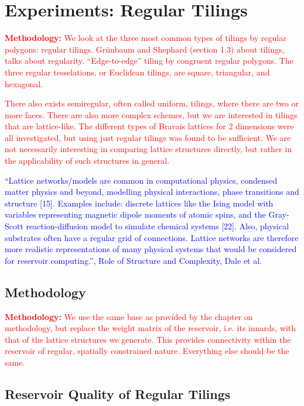 \chapter{Experiments: Regular Tilings}

\textcolor{red}{
  \textbf{Methodology:} We look at the three most common types of tilings by
regular polygons: regular tilings. Grünbaum and Shephard (section 1.3) about
tilings, talks about regularity. ``Edge-to-edge'' tiling by congruent regular
polygons. The three regular tesselations, or Euclidean tilings, are square,
triangular, and hexagonal.
}

\textcolor{red}{
  There also exists semiregular, often called uniform, tilings, where there are
two or more faces. There are also more complex schemes, but we are interested in
tilings that are lattice-like. The different types of Bravais lattices for 2
dimensions were all investigated, but using just regular tilings was found to be
sufficient. We are not necessarily interesting in comparing lattice structures
directly, but rather in the applicability of such structures in general.
}

\textcolor{blue}{
  ``Lattice networks/models are common in computational physics, condensed
matter physics and beyond, modelling physical interactions, phase transitions
and structure [15]. Examples include: discrete lattices like the Ising model
with variables representing magnetic dipole moments of atomic spins, and the
Gray- Scott reaction-diffusion model to simulate chemical systems [22]. Also,
physical substrates often have a regular grid of connections. Lattice networks
are therefore more realistic representations of many physical systems that would
be considered for reservoir computing.'', Role of Structure and Complexity, Dale
et al.
}

\section{Methodology}

\textcolor{red}{
  \textbf{Methodology:} We use the same base as provided by the chapter on
methodology, but replace the weight matrix of the reservoir, i.e. its innards,
with that of the lattice structures we generate. This provides connectivity
within the reservoir of regular, spatially constrained nature. Everything else
should be the same.
}

\section{Reservoir Quality of Regular Tilings}

